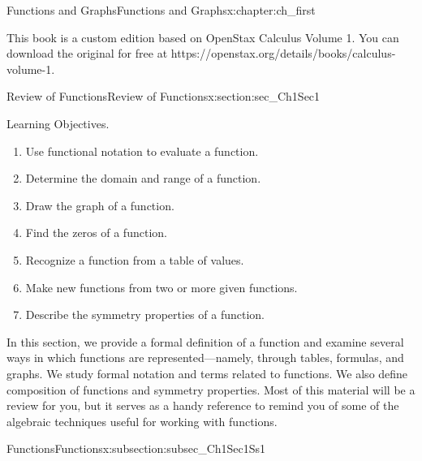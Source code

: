 \documentclass[oneside,10pt,]{book}
\numberwithin{equation}{section}
\begin{document}
\begin{chapterptx}{Functions and Graphs}{}{Functions and Graphs}{}{}{x:chapter:ch_first}
\begin{introduction}{}
This book is a custom edition based on OpenStax Calculus Volume 1. You can download the original for free at https:\slash{}\slash{}openstax.org\slash{}details\slash{}books\slash{}calculus-volume-1.%
\end{introduction}%
%
%
\typeout{************************************************}
\typeout{************************************************}
%
\begin{sectionptx}{Review of Functions}{}{Review of Functions}{}{}{x:section:sec_Ch1Sec1}
\begin{introduction}{Learning Objectives.}%
%
\begin{enumerate}
\item{}Use functional notation to evaluate a function.%
\item{}Determine the domain and range of a function.%
\item{}Draw the graph of a function.%
\item{}Find the zeros of a function.%
\item{}Recognize a function from a table of values.%
\item{}Make new functions from two or more given functions.%
\item{}Describe the symmetry properties of a function.%
\end{enumerate}
In this section, we provide a formal definition of a function and examine several ways in which functions are represented—namely, through tables, formulas, and graphs. We study formal notation and terms related to functions. We also define composition of functions and symmetry properties. Most of this material will be a review for you, but it serves as a handy reference to remind you of some of the algebraic techniques useful for working with functions.%
\end{introduction}%
%
%
\typeout{************************************************}
\typeout{************************************************}
%
\begin{subsectionptx}{Functions}{}{Functions}{}{}{x:subsection:subsec_Ch1Sec1Ss1}

\end{subsectionptx}
\end{sectionptx}
\end{chapterptx}
\end{document}
